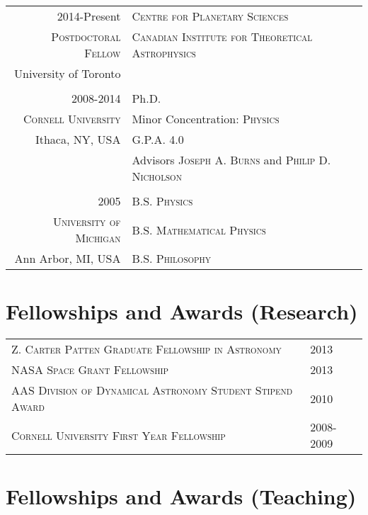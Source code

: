 \documentclass[10pt]{article} %
\begin{document}
\begin{tabular}{r|p{11cm}}
{2014-Present} & \textsc{Centre for Planetary Sciences} \\
\textsc{Postdoctoral Fellow} & \textsc{Canadian Institute for Theoretical Astrophysics}  \\
University of Toronto &  \\

\multicolumn{2}{c}{} \\

\textsc{2008-2014} & Ph.D. \\
\textsc{Cornell University} & Minor Concentration:  \textsc{Physics} \\
Ithaca, NY, USA & G.P.A. 4.0 \\ 
& Advisors \textsc{Joseph A. Burns} and \textsc{Philip D. Nicholson}\\

\multicolumn{2}{c}{} \\


\textsc{2005} & \textsc{B.S. Physics} \\
\textsc{University of Michigan} & \textsc{B.S. Mathematical Physics} \\
Ann Arbor, MI, USA & \textsc{B.S. Philosophy} \\
\end{tabular}


\section{Fellowships and Awards (Research)}

\begin{tabular}{l>{\hfill}p{2.2cm}}
\textsc{Z. Carter Patten Graduate Fellowship in Astronomy} & 2013 \\
\textsc{NASA Space Grant Fellowship} & 2013 \\
\textsc{AAS Division of Dynamical Astronomy Student Stipend Award} & 2010\\
\textsc{Cornell University First Year Fellowship} & 2008-2009 \\
\end{tabular}

\section{Fellowships and Awards (Teaching)}
\end{document}
